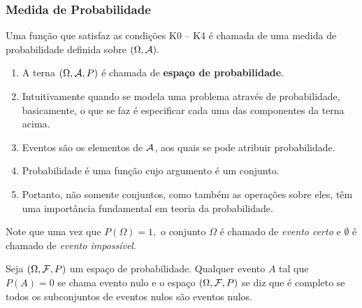 \begin{frame}
\frametitle{Medida de Probabilidade}
\begin{defi}
Uma função que satisfaz as condições K0 -- K4 é chamada de uma medida de probabilidade definida sobre $(\Omega , {\cal A}).$
\end{defi}

\begin{enumerate}

\item A terna $(\Omega , {\cal A} , P)$ \'e chamada de {\bf espa\c co de
probabilidade}. 

\item Intuitivamente quando se modela uma problema
atrav\'es de probabilidade, basicamente, o que se faz \'e
especificar cada uma das componentes da terna acima.

\item Eventos s\~ao os elementos de $\cal A$, aos quais
se pode atribuir probabilidade.

\item Probabilidade \'e uma fun\c c\~ao cujo argumento \'e um
conjunto. 

\item Portanto, n\~ao somente conjuntos, como
tamb\'em as opera\c c\~oes sobre eles, t\^em
uma import\^ancia fundamental em teoria da
probabilidade.
\end{enumerate}

Note que  uma vez que $P(\Omega)=1,$ o conjunto $\Omega$ é chamado de {\it evento certo} e $\emptyset$ é chamado de {\it evento impossível}.


\begin{defi}
	Seja $(\Omega, {\cal F}, P)$ um espaço de probabilidade. Qualquer evento $A$ tal
	que $P(A)=0$ se chama evento nulo e o espaço $(\Omega, {\cal F}, P)$ se diz que é completo se
	todos os subconjuntos de eventos nulos são eventos nulos.
\end{defi}

\end{frame}


